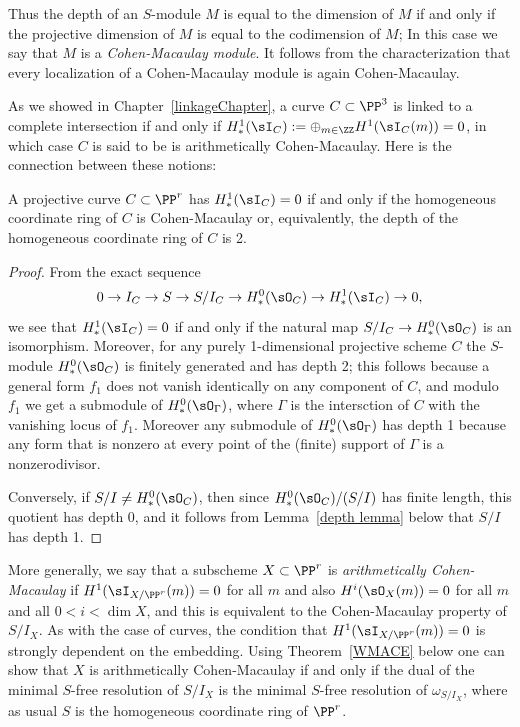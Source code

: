 Thus the depth of an $S$-module $M$ is equal to the dimension of $M$ if and only if the projective dimension
of $M$ is equal to the codimension of $M$; In this case we say that $M$ is a
\emph{Cohen-Macaulay module}. It follows from the characterization that every localization of a Cohen-Macaulay
module is again Cohen-Macaulay.

As we showed in Chapter~\ref{linkageChapter}, a curve $C\subset \PP^3$ is linked to a complete intersection
if and only if  $H^1_*(\sI_C) := \oplus_{m\in \ZZ} H^1(\sI_C(m)) = 0$, in which case $C$ is said to be is arithmetically Cohen-Macaulay. Here is the connection between these notions: 

\begin{proposition}\label{meaning of ACM}
A projective curve $C \subset \PP^r$  has $H^1_*(\sI_C) = 0$ if and only if the homogeneous coordinate ring of $C$
is Cohen-Macaulay or, equivalently, the depth of the homogeneous  coordinate ring of $C$ is 2.
\end{proposition}

\begin{proof}
 From the exact sequence
$$
0\to I_C \to S \to S/I_C \to  H^0_*( \sO_C) \to H^1_*(\sI_C) \to 0,
$$
we see that $H^1_*(\sI_C) = 0$ if and only if the natural map $S/I_C\to H^0_*(\sO_C)$ is an isomorphism. 
Moreover, for any purely 1-dimensional projective scheme $C$ the $S$-module $H^0_*(\sO_C)$ is finitely generated and
 has depth 2; this follows because
a general form $f_1$ does not vanish identically on any component of $C$, and modulo $f_1$ we get a submodule of $H^0_*(\sO_\Gamma)$, where $\Gamma$ is the intersction of $C$ with the vanishing locus of $f_1$. Moreover any submodule of $H^0_*(\sO_\Gamma)$ has depth
1 because any form that is nonzero at every point of the (finite) support of $\Gamma$ is a nonzerodivisor.

Conversely, if $S/I\neq H^0_*( \sO_C)$, then since $H^0_*( \sO_C)/(S/I)$ has finite length, this quotient has depth 0,
and it follows from Lemma~\ref{depth lemma} below that $S/I$ has depth 1.
\end{proof}

More generally, we say that a subscheme $X\subset \PP^r$ is \emph{arithmetically Cohen-Macaulay}
if $H^1(\sI_{X/\PP^r}(m)) = 0$ for all $m$ and also $H^i(\sO_X(m)) = 0$ for all $m$ and all $0<i<\dim X$,
and this is equivalent to the Cohen-Macaulay property of $S/I_X$. As with the case of curves,
the condition that $H^1(\sI_{X/\PP^r}(m)) = 0$ 
is strongly dependent on the embedding. Using Theorem~\ref{WMACE} below one can show
that $X$ is arithmetically Cohen-Macaulay if and only if the dual of the minimal $S$-free resolution
of $S/I_X$ is the minimal $S$-free resolution of $\omega_{S/I_X}$, where as usual $S$ is the
homogeneous coordinate ring of $\PP^r$.


